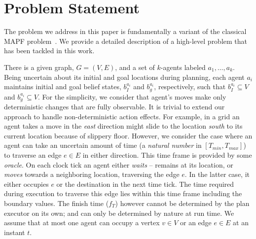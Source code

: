 \documentclass{article}
\begin{document}
\section{Problem Statement}
The problem we address in this paper is fundamentally a variant of the classical MAPF problem~\cite{SharonSFS12}. We provide a detailed description of a high-level problem that has been tackled in this work.

There is a given graph, $G = (V,E)$, and a set of $k$-agents labeled $a_1,\ldots,a_k$. Being uncertain about its initial and goal locations during planning, each agent $a_i$ maintains initial and goal belief states, $b_I^{a_i}$ and $b_g^{a_i}$, respectively, such that $b_I^{a_i} \subseteq V$ and $b_g^{a_i} \subseteq V$. 
For the simplicity, we consider that agent's moves make only deterministic changes that are fully observable. It is trivial to extend our approach to handle non-deterministic action effects. 
For example, in a grid an agent takes a move in the \emph{east} direction might slide to the location \emph{south} to its current location because of slippery floor. However, we consider the case where an agent can take an uncertain amount of time (a \emph{natural number} in $[T_{min}, T_{max}]$) to traverse an edge $e \in E$ in either direction. This time frame is provided by some \emph{oracle}.
%
On each clock tick an agent either \emph{waits} -- remains at its location, or \emph{moves} towards a neighboring location, traversing the edge $e$. In the latter case, it either occupies $e$ or the destination in the next time tick. 
%
%
%
The time required during execution to traverse this edge lies within this time frame including the boundary values.
The finish time ($f_T$) however cannot be determined by the plan executor on its own; and can only be determined by nature at run time.
We assume that at most one agent can occupy a vertex $v \in V$ or an edge $e \in E$ at an instant $t$.  
\end{document}
